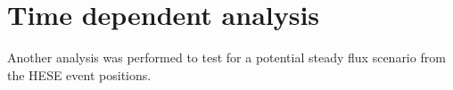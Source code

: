 \chapter{Time dependent analysis}

Another analysis was performed to test for a potential steady flux scenario from the HESE event positions.
